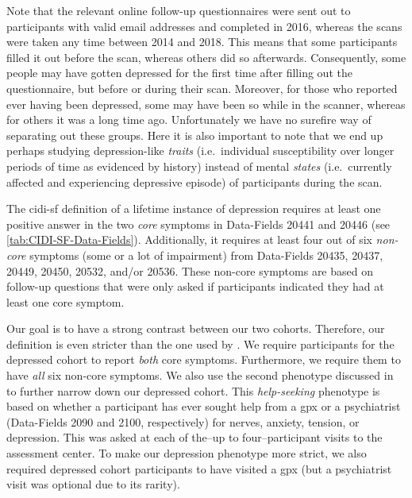 Note that the relevant online follow-up questionnaires were sent out to participants with valid email addresses and completed in 2016, whereas the scans were taken any time between 2014 and 2018.
This means that some participants filled it out before the scan, whereas others did so afterwards.
Consequently, some people may have gotten depressed for the first time after filling out the questionnaire, but before or during their scan.
Moreover, for those who reported ever having been depressed, some may have been so while in the scanner, whereas for others it was a long time ago.
Unfortunately we have no surefire way of separating out these groups.
Here it is also important to note that we end up perhaps studying depression-like \emph{traits} (i.e.~individual susceptibility over longer periods of time as evidenced by history) instead of mental \emph{states} (i.e.~currently affected and experiencing depressive episode) of participants during the scan.

The \gls{cidi-sf} definition of a lifetime instance of depression requires at least one positive answer in the two \emph{core} symptoms in Data-Fields 20441 and 20446 (see \cref{tab:CIDI-SF-Data-Fields}).
Additionally, it requires at least four out of six \emph{non-core} symptoms (some or a lot of impairment) from Data-Fields 20435, 20437, 20449, 20450, 20532, and/or 20536.
These non-core symptoms are based on follow-up questions that were only asked if participants indicated they had at least one core symptom.



Our goal is to have a strong contrast between our two cohorts.
Therefore, our definition is even stricter than the one used by \textcite{Howard2020}.
We require participants for the depressed cohort to report \emph{both} core symptoms.
Furthermore, we require them to have \emph{all} six non-core symptoms.
We also use the second phenotype discussed in \textcite{Howard2020} to further narrow down our depressed cohort.
This \emph{help-seeking} phenotype is based on whether a participant has ever sought help from a \gls{gpx} or a psychiatrist (Data-Fields 2090 and 2100, respectively) for nerves, anxiety, tension, or depression.
This was asked at each of the--up to four--participant visits to the assessment center.
To make our depression phenotype more strict, we also required depressed cohort participants to have visited a \gls{gpx} (but a psychiatrist visit was optional due to its rarity).

